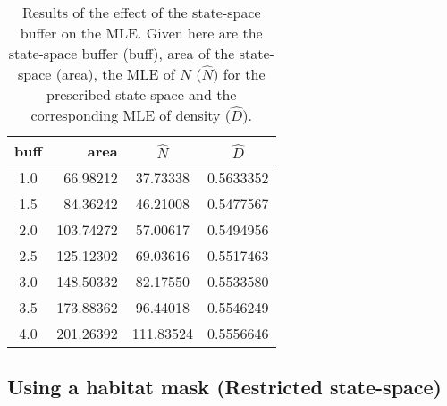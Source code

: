 \begin{table}[ht]
\centering
\caption{Results of the effect of the state-space buffer on the MLE. 
Given here are the state-space buffer (buff), area of the state-space (area), the
MLE of $N$ ($\hat{N}$) for the prescribed state-space and the corresponding MLE of
density ($\hat{D}$).}
\begin{tabular}{crcc}
\hline \hline
buff    & area & $\hat{N}$ & $\hat{D}$ \\ \hline
 1.0 & 66.98212 & 37.73338 & 0.5633352  \\
 1.5 & 84.36242 & 46.21008 & 0.5477567  \\
 2.0 &103.74272 & 57.00617 & 0.5494956  \\
 2.5 &125.12302 & 69.03616 & 0.5517463  \\
 3.0 &148.50332 & 82.17550 & 0.5533580  \\ 
 3.5 &173.88362 & 96.44018 & 0.5546249  \\
 4.0 &201.26392 &111.83524 & 0.5556646  \\  \hline
\end{tabular}
\label{mle.tab.buff}
\end{table}


\subsection{Using a habitat mask (Restricted state-space)}
\label{mle.sec.shapefile}

